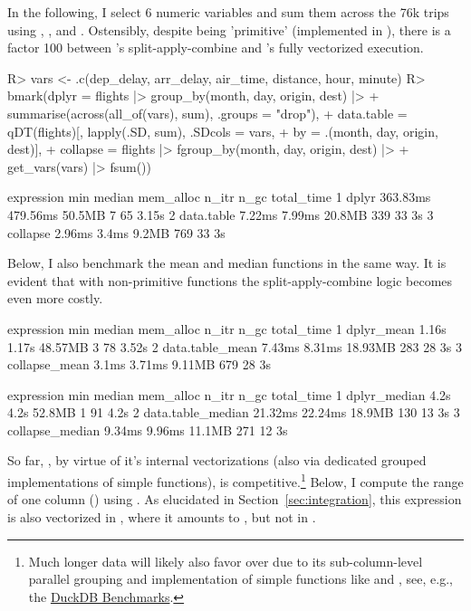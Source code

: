 \documentclass[nojss]{jss} %
\newcommand{\fct}[1]{\code{#1()}}
\begin{document}
%
In the following, I select 6 numeric variables and sum them across the 76k trips using , , and . Ostensibly, despite \fct{sum} being 'primitive' (implemented in ), there is a factor 100 between 's split-apply-combine and 's fully vectorized execution.
%
\begin{Schunk}
\begin{Sinput}
R> vars <- .c(dep_delay, arr_delay, air_time, distance, hour, minute)
R> bmark(dplyr = flights |> group_by(month, day, origin, dest) |>
+                  summarise(across(all_of(vars), sum), .groups = "drop"),
+        data.table = qDT(flights)[, lapply(.SD, sum), .SDcols = vars,
+                                  by = .(month, day, origin, dest)],
+        collapse = flights |> fgroup_by(month, day, origin, dest) |>
+                     get_vars(vars) |> fsum())
\end{Sinput}
\begin{Soutput}
  expression      min   median mem_alloc n_itr n_gc total_time
1      dplyr 363.83ms 479.56ms    50.5MB     7   65      3.15s
2 data.table   7.22ms   7.99ms    20.8MB   339   33         3s
3   collapse   2.96ms    3.4ms     9.2MB   769   33         3s
\end{Soutput}
\end{Schunk}
%
Below, I also benchmark the mean and median functions in the same way. It is evident that with non-primitive  functions the split-apply-combine logic becomes even more costly.
%
\begin{Schunk}
\begin{Soutput}
       expression    min median mem_alloc n_itr n_gc total_time
1      dplyr_mean  1.16s  1.17s   48.57MB     3   78      3.52s
2 data.table_mean 7.43ms 8.31ms   18.93MB   283   28         3s
3   collapse_mean  3.1ms 3.71ms    9.11MB   679   28         3s
\end{Soutput}
\begin{Soutput}
         expression     min  median mem_alloc n_itr n_gc total_time
1      dplyr_median    4.2s    4.2s    52.8MB     1   91       4.2s
2 data.table_median 21.32ms 22.24ms    18.9MB   130   13         3s
3   collapse_median  9.34ms  9.96ms    11.1MB   271   12         3s
\end{Soutput}
\end{Schunk}
%
So far, , by virtue of it's internal vectorizations (also via dedicated grouped  implementations of simple functions), is competitive.\footnote{Much longer data will likely also favor  over  due to its sub-column-level parallel grouping and implementation of simple functions like \fct{sum} and \fct{mean}, see, e.g., the \href{https://duckdblabs.github.io/db-benchmark/}{DuckDB Benchmarks}.} Below, I compute the range of one column () using . As elucidated in Section~\ref{sec:integration}, this expression is also vectorized in , where it amounts to , but not in .
\end{document}
